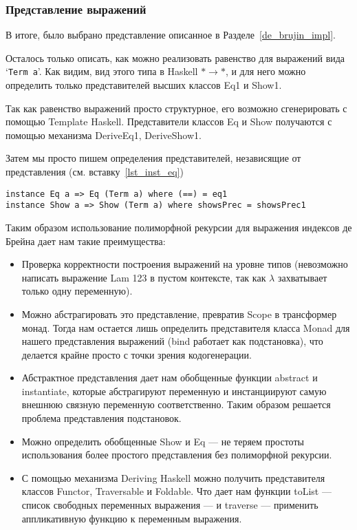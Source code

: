 \subsubsection{Представление выражений}\label{final_repr}

В итоге, было выбрано представление описанное в Разделе~\ref{de_brujin_impl}.

Осталось только описать, как можно реализовать равенство для выражений вида `\lstinline{Term a}'. Как видим, вид этого типа в Haskell $* \rightarrow *$, и для него можно определить только представителей высших классов\cite{prel_extras} Eq1 и Show1.

Так как равенство выражений просто структурное, его возможно сгенерировать с помощью Template Haskell\cite{TH}. Представители классов Eq и Show получаются с помощью механизма DeriveEq1, DeriveShow1\cite{deriveCompat}.

Затем мы просто пишем определения представителей, независящие от представления (см. вставку~\ref{lst_inst_eq})

\begin{lstlisting}[caption={Определение представителей классов Eq и Show для представления АСД}, captionpos=b, frame=single, float,floatplacement=H, label = {lst_inst_eq}]
instance Eq a => Eq (Term a) where (==) = eq1
instance Show a => Show (Term a) where showsPrec = showsPrec1
\end{lstlisting}

Таким образом использование полиморфной рекурсии для выражения индексов де Брейна дает нам такие преимущества:
\begin{itemize}
  \item Проверка корректности построения выражений на уровне типов (невозможно написать выражение Lam 123 в пустом контексте, так как $\lambda$ захватывает только одну переменную).
  \item Можно абстрагировать это представление, превратив Scope в трансформер монад. Тогда нам остается лишь определить представителя класса Monad для нашего представления выражений (bind работает как подстановка), что делается крайне просто с точки зрения кодогенерации.
  \item Абстрактное представления дает нам обобщенные функции abstract и instantiate, которые абстрагируют переменную и инстанциируют самую внешнюю связную переменную соответственно. Таким образом решается проблема представления подстановок.
  \item Можно определить обобщенные Show и Eq --- не теряем простоты использования более простого представления без полиморфной рекурсии.
  \item С помощью механизма Deriving Haskell можно получить представителя классов Functor, Traversable и Foldable. Что дает нам функции toList --- список свободных переменных выражения --- и traverse --- применить аппликативную функцию к переменным выражения.

\end{itemize}

